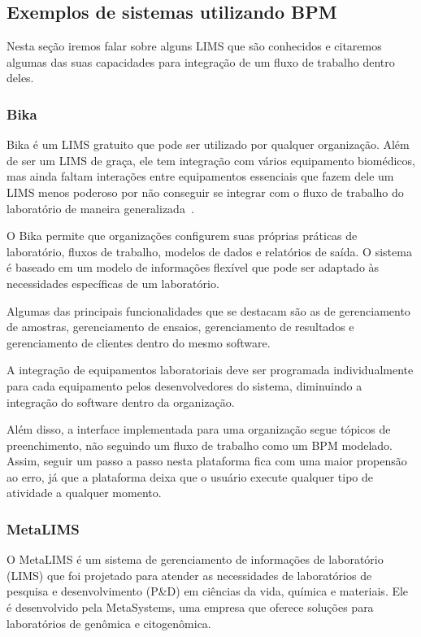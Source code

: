 \subsection{Exemplos de sistemas utilizando BPM} \label{sec:lims-exemplo}

Nesta seção iremos falar sobre alguns LIMS que são conhecidos e citaremos algumas das suas capacidades para integração de um fluxo de trabalho dentro deles.

\subsubsection{Bika}

Bika é um LIMS gratuito que pode ser utilizado por qualquer organização. Além de ser um LIMS de graça, ele tem integração com vários equipamento biomédicos, mas ainda faltam interações entre equipamentos essenciais que fazem dele um LIMS menos poderoso por não conseguir se integrar com o fluxo de trabalho do laboratório de maneira generalizada~\cite{Ademuyiwa2018DevelopmentBiobanking}.

O Bika permite que organizações configurem suas próprias práticas de laboratório, fluxos de trabalho, modelos de dados e relatórios de saída. O sistema é baseado em um modelo de informações flexível que pode ser adaptado às necessidades específicas de um laboratório.

Algumas das principais funcionalidades que se destacam são as de gerenciamento de amostras, gerenciamento de ensaios, gerenciamento de resultados e gerenciamento de clientes dentro do mesmo software.

A integração de equipamentos laboratoriais deve ser programada individualmente para cada equipamento pelos desenvolvedores do sistema, diminuindo a integração do software dentro da organização.

Além disso, a interface implementada para uma organização segue tópicos de preenchimento, não seguindo um fluxo de trabalho como um BPM modelado. Assim, seguir um passo a passo nesta plataforma fica com uma maior propensão ao erro, já que a plataforma deixa que o usuário execute qualquer tipo de atividade a qualquer momento.

\subsubsection{MetaLIMS}

O MetaLIMS é um sistema de gerenciamento de informações de laboratório (LIMS) que foi projetado para atender as necessidades de laboratórios de pesquisa e desenvolvimento (P\&D) em ciências da vida, química e materiais. Ele é desenvolvido pela MetaSystems, uma empresa que oferece soluções para laboratórios de genômica e citogenômica.

